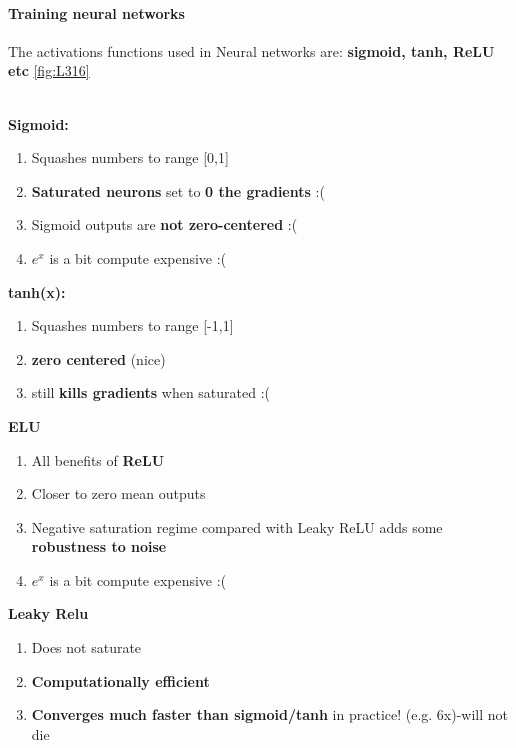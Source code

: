\documentclass[11pt]{article}
\begin{document}
\paragraph{Training neural networks}
The activations functions used in Neural networks are: \textbf{sigmoid, tanh, ReLU etc} \ref{fig:L316}\\\\
\begin{minipage}{0.5\textwidth}

\textbf{Sigmoid:}
\begin{enumerate}
    \item Squashes numbers to range [0,1]
    \item \textbf{Saturated neurons} set to \textbf{0 the gradients} :(
    \item Sigmoid outputs are \textbf{not zero-centered} :(
    \item $e^x$ is a bit compute expensive :(
\end{enumerate}{}

\textbf{tanh(x):}
\begin{enumerate}
    \item Squashes numbers to range [-1,1]
    \item \textbf{zero centered} (nice)
    \item still \textbf{kills gradients} when saturated :(
    
\end{enumerate}{}


\textbf{ELU}

\begin{enumerate}
    \item All benefits of\textbf{ ReLU}
    \item Closer to zero mean outputs 
    \item Negative saturation regime compared with Leaky ReLU adds some \textbf{robustness to noise }
     \item $e^x$ is a bit compute expensive :(
\end{enumerate}{}
\textbf{Leaky Relu}
\begin{enumerate}
    \item Does not saturate
    \item \textbf{Computationally efficient}
    \item \textbf{Converges much faster than sigmoid/tanh} in practice! (e.g. 6x)-will not die
\end{enumerate}{}
\end{minipage}
\end{document}
